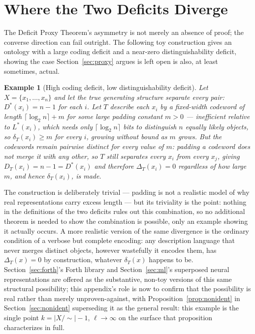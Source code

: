 \documentclass[11pt]{article}
\theoremstyle{plain}
\newtheorem{example}{Example}
\begin{document}
\section{Where the Two Deficits Diverge}
\label{app:counterexamples}

The Deficit Proxy Theorem's asymmetry is not merely an absence of proof; the converse direction can fail outright. The following toy construction gives an ontology with a large coding deficit and a near-zero distinguishability deficit, showing the case Section~\ref{sec:proxy} argues is left open is also, at least sometimes, actual.

\begin{example}[High coding deficit, low distinguishability deficit]
Let $X = \{x_1, \dots, x_n\}$ and let the true generating structure separate every pair: $D^*(x_i) = n - 1$ for each $i$. Let $T$ describe each $x_i$ by a fixed-width codeword of length $\lceil \log_2 n \rceil + m$ for some large padding constant $m > 0$ --- inefficient relative to $L^*(x_i)$, which needs only $\lceil \log_2 n \rceil$ bits to distinguish $n$ equally likely objects, so $\delta_T(x_i) \ge m$ for every $i$, growing without bound as $m$ grows. But the codewords remain pairwise distinct for every value of $m$: padding a codeword does not merge it with any other, so $T$ still separates every $x_i$ from every $x_j$, giving $D_T(x_i) = n - 1 = D^*(x_i)$ and therefore $\Delta_T(x_i) = 0$ regardless of how large $m$, and hence $\delta_T(x_i)$, is made.
\end{example}

The construction is deliberately trivial --- padding is not a realistic model of why real representations carry excess length --- but its triviality is the point: nothing in the definitions of the two deficits rules out this combination, so no additional theorem is needed to show the combination is possible, only an example showing it actually occurs. A more realistic version of the same divergence is the ordinary condition of a verbose but complete encoding: any description language that never merges distinct objects, however wastefully it encodes them, has $\Delta_T(x) = 0$ by construction, whatever $\delta_T(x)$ happens to be. Section~\ref{sec:forth}'s Forth library and Section~\ref{sec:ml}'s superposed neural representations are offered as the substantive, non-toy versions of this same structural possibility; this appendix's role is now to confirm that the possibility is real rather than merely unproven-against, with Proposition~\ref{prop:nonident} in Section~\ref{sec:nonident} superseding it as the general result: this example is the single point $k = |X/\!\sim|-1$, $\ell \to \infty$ on the surface that proposition characterizes in full.
\end{document}
